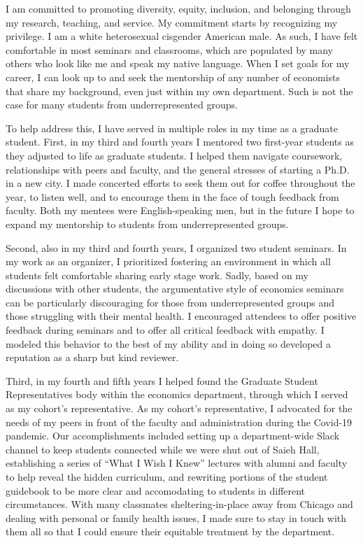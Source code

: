 \documentclass{jmstatement}
\begin{document}
\pagestyle{fancy}
\fancyhf{}
\fancyhead[L]{\bfseries\scshape \myname} %




I am committed to promoting diversity, equity, inclusion, and belonging
through my research, teaching, and service.
My commitment starts by recognizing my privilege.
I am a white heterosexual cisgender American male.
As such, I have felt comfortable in most seminars and classrooms, which
are populated by many others who look like me and speak my native language.
When I set goals for my career, I can look up to and seek the mentorship
of any number of economists that share my background, even just within my own
department.
Such is not the case for many students from underrepresented groups.

To help address this, I have served in multiple roles in my time as a graduate
student. First, in my third and fourth years I mentored two first-year students
as they adjusted to life as graduate students. I helped them navigate coursework,
relationships with peers and faculty, and the general stresses of starting a Ph.D.
in a new city. I made concerted efforts to seek them out for coffee throughout the
year, to listen well, and to encourage them in the face of tough feedback from
faculty. Both my mentees were English-speaking men, but in the future I hope
to expand my mentorship to students from underrepresented groups.

Second, also in my third and fourth years, I organized two student seminars.
In my work as an organizer, I prioritized fostering an environment in which all
students felt comfortable sharing early stage work.
Sadly, based on my discussions with other students,
the argumentative style of economics seminars can be particularly
discouraging for those from underrepresented groups and those struggling
with their mental health.
I encouraged attendees to offer positive feedback during seminars and to offer
all critical feedback with empathy.
I modeled this behavior to the best of my ability and in doing so developed
a reputation as a sharp but kind reviewer.

Third, in my fourth and fifth years I helped found the Graduate Student Representatives
body within the economics department, through which I served as my cohort's representative.
As my cohort's representative, I advocated for the needs of my peers in front
of the faculty and administration during the Covid-19 pandemic.
Our accomplishments included setting up a department-wide Slack channel to keep
students connected while we were shut out of Saieh Hall,
establishing a series of ``What I Wish I Knew'' lectures with alumni and faculty
to help reveal the hidden curriculum,
and rewriting portions of the student guidebook to be more clear and accomodating
to students in different circumstances.
With many classmates sheltering-in-place away from Chicago and dealing with
personal or family health issues, I made sure to stay in touch with them all
so that I could ensure their equitable treatment by the department.
\end{document}
